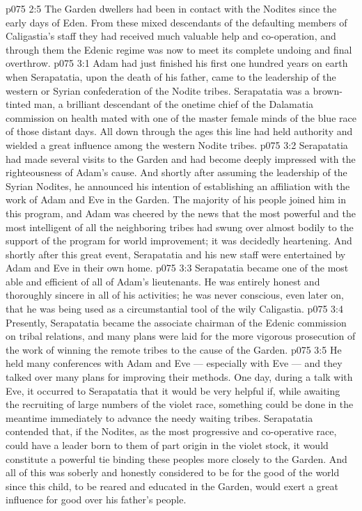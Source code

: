 \vs p075 2:5 The Garden dwellers had been in contact with the Nodites since the early days of Eden. From these mixed descendants of the defaulting members of Caligastia’s staff they had received much valuable help and co\hyp{}operation, and through them the Edenic regime was now to meet its complete undoing and final overthrow.
\vs p075 3:1 Adam had just finished his first one hundred years on earth when Serapatatia, upon the death of his father, came to the leadership of the western or Syrian confederation of the Nodite tribes. Serapatatia was a brown\hyp{}tinted man, a brilliant descendant of the onetime chief of the Dalamatia commission on health mated with one of the master female minds of the blue race of those distant days. All down through the ages this line had held authority and wielded a great influence among the western Nodite tribes.
\vs p075 3:2 Serapatatia had made several visits to the Garden and had become deeply impressed with the righteousness of Adam’s cause. And shortly after assuming the leadership of the Syrian Nodites, he announced his intention of establishing an affiliation with the work of Adam and Eve in the Garden. The majority of his people joined him in this program, and Adam was cheered by the news that the most powerful and the most intelligent of all the neighboring tribes had swung over almost bodily to the support of the program for world improvement; it was decidedly heartening. And shortly after this great event, Serapatatia and his new staff were entertained by Adam and Eve in their own home.
\vs p075 3:3 \pc Serapatatia became one of the most able and efficient of all of Adam’s lieutenants. He was entirely honest and thoroughly sincere in all of his activities; he was never conscious, even later on, that he was being used as a circumstantial tool of the wily Caligastia.
\vs p075 3:4 \pc Presently, Serapatatia became the associate chairman of the Edenic commission on tribal relations, and many plans were laid for the more vigorous prosecution of the work of winning the remote tribes to the cause of the Garden.
\vs p075 3:5 He held many conferences with Adam and Eve --- especially with Eve --- and they talked over many plans for improving their methods. One day, during a talk with Eve, it occurred to Serapatatia that it would be very helpful if, while awaiting the recruiting of large numbers of the violet race, something could be done in the meantime immediately to advance the needy waiting tribes. Serapatatia contended that, if the Nodites, as the most progressive and co\hyp{}operative race, could have a leader born to them of part origin in the violet stock, it would constitute a powerful tie binding these peoples more closely to the Garden. And all of this was soberly and honestly considered to be for the good of the world since this child, to be reared and educated in the Garden, would exert a great influence for good over his father’s people.
